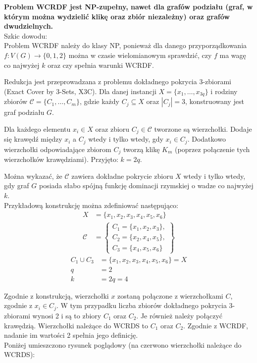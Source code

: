 \textbf{Problem WCRDF jest NP-zupełny, nawet dla grafów podziału (graf, w którym można wydzielić klikę oraz zbiór niezależny) oraz grafów dwudzielnych.}\\

Szkic dowodu:\\
Problem WCRDF należy do klasy NP, ponieważ dla danego przyporządkowania $f : V(G) \rightarrow \{0, 1, 2\}$ można w czasie wielomianowym sprawdzić, czy $f$ ma wagę co najwyżej $k$ oraz czy spełnia warunki WCRDF.

Redukcja jest przeprowadzana z problemu dokładnego pokrycia 3-zbiorami (Exact Cover by 3-Sets, X3C). Dla danej instancji $X = \{x_1, \dots, x_{3q}\}$ i rodziny zbiorów $\mathcal{C} = \{C_1, \dots, C_m\}$, gdzie każdy $C_j \subseteq X$ oraz $|C_j| = 3$, konstruowany jest graf podziału $G$.

Dla każdego elementu $x_i \in X$ oraz zbioru $C_j \in \mathcal{C}$ tworzone są wierzchołki. Dodaje się krawędź między $x_i$ a $C_j$ wtedy i tylko wtedy, gdy $x_i \in C_j$. Dodatkowo wierzchołki odpowiadające zbiorom $C_j$ tworzą klikę $K_m$ (poprzez połączenie tych wierzchołków krawędziami). Przyjęto: $k = 2q$.

Można wykazać, że $\mathcal{C}$ zawiera dokładne pokrycie zbioru $X$ wtedy i tylko wtedy, gdy graf $G$ posiada słabo spójną funkcję dominacji rzymskiej o wadze co najwyżej $k$.\\

Przykładową konstrukcję można zdefiniować następująco:
\begin{align*}
X &= \{x_1, x_2, x_3, x_4, x_5, x_6\} \\
\mathcal{C} &= \left\{
\begin{array}{l}
C_1 = \{x_1, x_2, x_3\}, \\
C_2 = \{x_2, x_4, x_5\}, \\
C_3 = \{x_4, x_5, x_6\}
\end{array}
\right\}
\end{align*}
\begin{align*}
C_1 \cup C_3 &= \{x_1, x_2, x_3, x_4, x_5, x_6\} = X \\
q &= 2 \\
k &= 2q = 4
\end{align*}

Zgodnie z konstrukcją, wierzchołki $x$ zostaną połączone z wierzchołkami $C$, zgodnie z  $x_i \in C_j$. W tym przypadku liczba zbiorów dokładnego pokrycia 3-zbiorami wynosi 2 i są to zbiory $C_1$ oraz $C_2$. Je również należy połączyć krawędzią. Wierzchołki należące do WCRDS to $C_1$ oraz $C_2$. Zgodnie z WCRDF, nadanie im wartości 2 spełnia jego definicję. \\
Poniżej umieszczono rysunek poglądowy (na czerwono wierzchołki należące do WCRDS):

